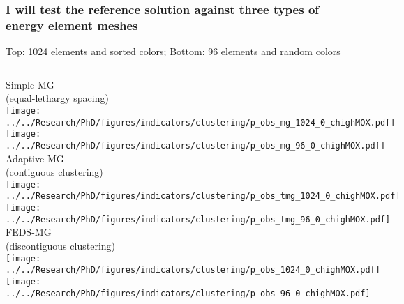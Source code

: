 \documentclass[compress,10pt]{beamer}
\begin{document}
\typeout{***********************************************************************************}

\begin{frame}
    \frametitle{I will test the reference solution against three types of energy element meshes}

    \centering

    \vspace{-3mm}
    {Top: 1024 elements and sorted colors; Bottom: 96 elements and random colors}
    \vspace{1.5mm}

    \begin{columns}
        \centering
        {\small Simple MG\\ (equal-lethargy spacing)} \\
        {}\texttt{[image: ../../Research/PhD/figures/indicators/clustering/p\_obs\_mg\_1024\_0\_chighMOX.pdf]} \\
        {}\texttt{[image: ../../Research/PhD/figures/indicators/clustering/p\_obs\_mg\_96\_0\_chighMOX.pdf]} \\

        \centering
        {\small Adaptive MG\\ (contiguous clustering)} \\
        {}\texttt{[image: ../../Research/PhD/figures/indicators/clustering/p\_obs\_tmg\_1024\_0\_chighMOX.pdf]} \\
        {}\texttt{[image: ../../Research/PhD/figures/indicators/clustering/p\_obs\_tmg\_96\_0\_chighMOX.pdf]} \\

        \centering
        {\small FEDS-MG\\ (discontiguous clustering)} \\
        {}\texttt{[image: ../../Research/PhD/figures/indicators/clustering/p\_obs\_1024\_0\_chighMOX.pdf]} \\
        {}\texttt{[image: ../../Research/PhD/figures/indicators/clustering/p\_obs\_96\_0\_chighMOX.pdf]} \\

    \end{columns}

\end{frame}
\end{document}
